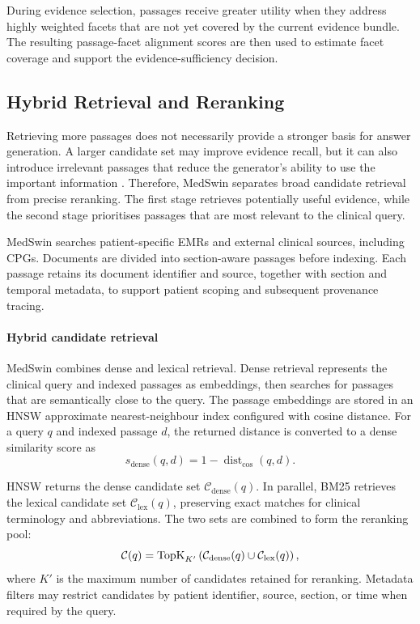 \documentclass[conference]{IEEEtran}
\begin{document}
During evidence selection, passages receive greater utility when they address highly weighted facets that are not yet covered by the current evidence bundle. The resulting passage-facet alignment scores are then used to estimate facet coverage and support the evidence-sufficiency decision.

\subsection{Hybrid Retrieval and Reranking}
\label{sec:retrieval-reranking}
Retrieving more passages does not necessarily provide a stronger basis for answer generation. A larger candidate set may improve evidence recall, but it can also introduce irrelevant passages that reduce the generator's ability to use the important information \cite{yu2024rankrag,liu2024lost}. Therefore, MedSwin separates broad candidate retrieval from precise reranking. The first stage retrieves potentially useful evidence, while the second stage prioritises passages that are most relevant to the clinical query.

MedSwin searches patient-specific EMRs and external clinical sources, including CPGs. Documents are divided into section-aware passages before indexing. Each passage retains its document identifier and source, together with section and temporal metadata, to support patient scoping and subsequent provenance tracing.

\paragraph{Hybrid candidate retrieval}
MedSwin combines dense and lexical retrieval. Dense retrieval represents the clinical query and indexed passages as embeddings, then searches for passages that are semantically close to the query. The passage embeddings are stored in an HNSW approximate nearest-neighbour index configured with cosine distance. For a query \(q\) and indexed passage \(d\), the returned distance is converted to a dense similarity score as
\begin{equation}
\label{eq:dense-retrieval}
s_{\mathrm{dense}}(q,d)
=
1-\operatorname{dist}_{\mathrm{cos}}(q,d).
\end{equation}

HNSW returns the dense candidate set \(\mathcal{C}_{\mathrm{dense}}(q)\). In parallel, BM25 retrieves the lexical candidate set \(\mathcal{C}_{\mathrm{lex}}(q)\), preserving exact matches for clinical terminology and abbreviations. The two sets are combined to form the reranking pool:
\begin{equation}
\label{eq:hybrid-candidates}
\small
\mathcal{C}(q)
=
\operatorname{TopK}_{K'}
\left(
\mathcal{C}_{\mathrm{dense}}(q)
\cup
\mathcal{C}_{\mathrm{lex}}(q)
\right),
\end{equation}
where \(K'\) is the maximum number of candidates retained for reranking. Metadata filters may restrict candidates by patient identifier, source, section, or time when required by the query.
\end{document}

